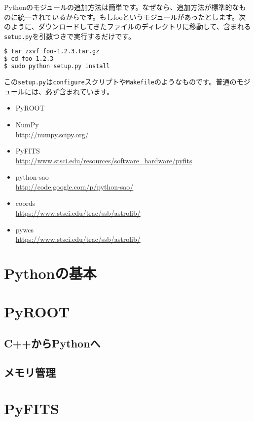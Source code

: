 Pythonのモジュールの追加方法は簡単です。なぜなら、追加方法が標準的なものに統一されているからです。もしfooというモジュールがあったとします。次のように、ダウンロードしてきたファイルのディレクトリに移動して、含まれる\texttt{setup.py}を引数つきで実行するだけです。
\begin{lstlisting}[language=bash]
$ tar zxvf foo-1.2.3.tar.gz
$ cd foo-1.2.3
$ sudo python setup.py install
\end{lstlisting}
この\texttt{setup.py}は\texttt{configure}スクリプトや\texttt{Makefile}のようなものです。普通のモジュールには、必ず含まれています。

\begin{itemize}
  \item PyROOT
  \item NumPy\\\url{http://numpy.scipy.org/}
  \item PyFITS\\\url{http://www.stsci.edu/resources/software_hardware/pyfits}
  \item python-sao\\\url{http://code.google.com/p/python-sao/}
  \item coords\\\url{https://www.stsci.edu/trac/ssb/astrolib/}
  \item pywcs\\\url{https://www.stsci.edu/trac/ssb/astrolib/}
\end{itemize}

\section{Pythonの基本}

\section{PyROOT}

\subsection{C++からPythonへ}

\subsection{メモリ管理}

\section{PyFITS}
